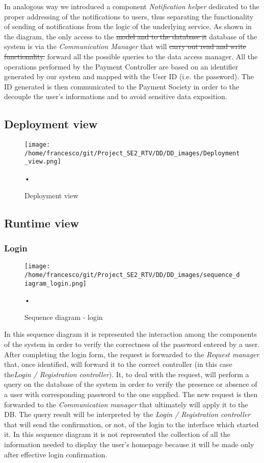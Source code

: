 \documentclass[10pt, a4paper,titlepage]{article}
\begin{document}
In analogous way we introduced a component \emph{Notification helper} dedicated to the proper addressing of the notifications to users, thus separating the functionality of sending of notifications from the logic of the underlying service.
As shown in the diagram, the only access to the \sout{model and to the database it} database of the system is via the \emph{Communication Manager} that will \sout{carry out read and write functionality.} forward all the possible queries to the data access manager.
All the operations performed by the Payment Controller are based on an identifier generated by our system and mapped with the User ID (i.e. the password). The ID generated is then communicated to the Payment Society in order to the decouple the user’s informations and to avoid sensitive data exposition.
\newpage
\subsection{Deployment view}
\begin{figure}[h]
\begin{center}
\texttt{[image: /home/francesco/git/Project\_SE2\_RTV/DD/DD\_images/Deployment\_view.png]}
\caption{Deployment view}
\label{fig:deployment_view}
\end{center}•
\end{figure}
\newpage
\subsection{Runtime view}
\subsubsection{Login}
\begin{figure}[h]
\begin{center}
\texttt{[image: /home/francesco/git/Project\_SE2\_RTV/DD/DD\_images/sequence\_diagram\_login.png]}
\caption{Sequence diagram - login}
\label{fig:sequence_diagram_login}
\end{center}•
\end{figure}
In this sequence diagram it is represented the interaction among the components of the system in order to verify the correctness of the password entered by a user.
After completing the login form, the request is forwarded to the \emph{Request manager} that, once identified, will forward it to the correct controller (in this case the\emph{Login / Registration controller}).
It, to deal with the request, will perform a query on the database of the system in order to verify the presence or absence of a user with corresponding password to the one supplied.
The new request is then forwarded to the \emph{Communication manager} that ultimately will apply it to the DB.
The query result will be interpreted by the \emph{Login / Registration controller} that will send the confirmation, or not, of the login to the interface which started it.
In this sequence diagram it is not represented the collection of all the information needed to display the user's homepage because it will be made only after effective login confirmation.
\end{document}
